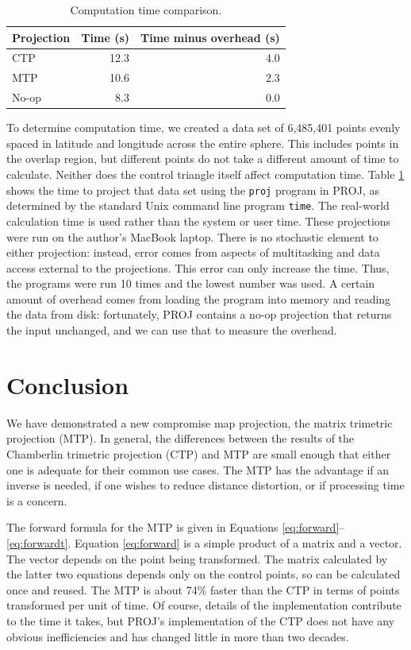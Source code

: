 \documentclass[]{interact}
\begin{document}
\begin{table}
\begin{tabular}{ l r r}
  Projection & Time (s) & Time minus overhead (s)\\
\hline
  CTP & 12.3 & 4.0 \\%
  MTP & 10.6 & 2.3 \\
  No-op & 8.3 & 0.0
\end{tabular}
\caption{Computation time comparison.}
\label{table:time}
\end{table}

To determine computation time, we created a data set of 6,485,401 points evenly
spaced in latitude and longitude across the entire sphere. This includes points
in the overlap region, but different points do not take a different amount of
time to calculate. Neither does the control triangle itself affect computation
time. Table \ref{table:time} shows the time to project that data set using the
\texttt{proj} program in PROJ, as determined by the standard Unix command line
program \texttt{time}. The real-world calculation time is used rather than the
system or user time. These projections were run on the author's MacBook laptop.
There is no stochastic element to either projection: instead, error comes from
aspects of multitasking and data access external to the projections. This error
can only increase the time. Thus, the programs were run 10 times and the lowest
number was used. A certain amount of overhead comes from loading the program
into memory and reading the data from disk: fortunately, PROJ contains a no-op
projection that returns the input unchanged, and we can use that to measure the
overhead.

\section{Conclusion}
We have demonstrated a new compromise map projection, the matrix trimetric
projection (MTP). In general, the differences between the results of the
Chamberlin trimetric projection (CTP) and MTP are small enough that either one
is adequate for their common use cases.
The MTP has the advantage if an inverse is needed,
if one wishes to reduce distance distortion, or if processing time is a concern.

The forward formula for the MTP is given in Equations
\ref{eq:forward}--\ref{eq:forwardt}. Equation \ref{eq:forward} is a simple
product of a matrix and a vector. The vector depends on the point being
transformed. The matrix calculated by the latter two equations depends only on
the control points, so can be calculated once and reused. The MTP is about 74\%
faster than the CTP in terms of points transformed per unit of time. Of course,
details of the implementation contribute to the time it takes, but PROJ's
implementation of the CTP does not have any obvious inefficiencies and has
changed little in more than two decades.
\end{document}

